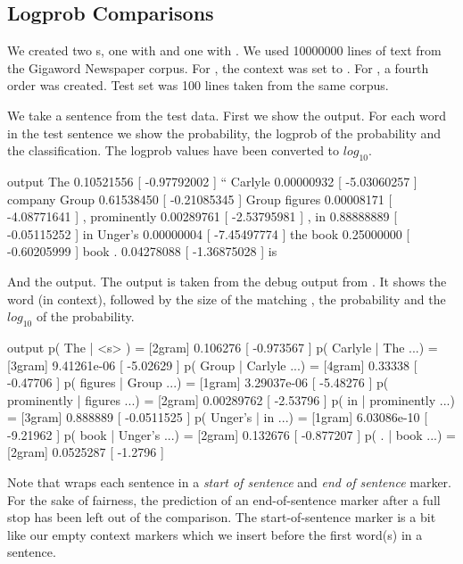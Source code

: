 \documentclass[a4paper,10pt,twoside]{report}
\begin{document}
\subsection{Logprob Comparisons}

We created two \lm{}s, one with \wopr{} and one with \srilm{}. We used
\num{10000000} lines of text from the Gigaword Newspaper corpus. For
\wopr{}, the context was set to . For \srilm{}, a fourth
order \lm{} was created. Test set was \num{100} lines taken from
the same corpus.

We take a sentence from the test data. First we show the \wopr{}
output. For each word in the test sentence we show the probability,
the logprob of the probability and the \wopr{} classification. The
logprob values have been converted to $log_{10}$.

\begin{wout}{\wopr{} output}
The         0.10521556   [ -0.97792002 ] ``
Carlyle     0.00000932   [ -5.03060257 ] company
Group       0.61538450   [ -0.21085345 ] Group
figures     0.00008171   [ -4.08771641 ] ,
prominently 0.00289761   [ -2.53795981 ] ,
in          0.88888889   [ -0.05115252 ] in
Unger's     0.00000004   [ -7.45497774 ] the
book        0.25000000   [ -0.60205999 ] book
.           0.04278088   [ -1.36875028 ] is
\end{wout}

And the \srilm{} output. The output is taken from the debug output from
\srilm{}. It shows the word (in context), followed by the size of the
matching \ngram{}, the probability and the $log_{10}$ of the probability.

\begin{wout}{\srilm{} output}
p( The | <s> )                = [2gram] 0.106276    [ -0.973567 ]
p( Carlyle | The ...)         = [3gram] 9.41261e-06 [ -5.02629 ]
p( Group | Carlyle ...)       = [4gram] 0.33338     [ -0.47706 ]
p( figures | Group ...)       = [1gram] 3.29037e-06 [ -5.48276 ]
p( prominently | figures ...) = [2gram] 0.00289762  [ -2.53796 ]
p( in | prominently ...)      = [3gram] 0.888889    [ -0.0511525 ]
p( Unger's | in ...)          = [1gram] 6.03086e-10 [ -9.21962 ]
p( book | Unger's ...)        = [2gram] 0.132676    [ -0.877207 ]
p( . | book ...)              = [2gram] 0.0525287   [ -1.2796 ]
\end{wout}

Note that \srilm{} wraps each sentence in a \emph{start of sentence}
and \emph{end of sentence} marker. For the sake of fairness, the
prediction of an end-of-sentence marker after a full stop has been
left out of the comparison. The start-of-sentence marker is a bit like
our empty context markers which we insert before the first word(s) in
a sentence. 
\end{document}

